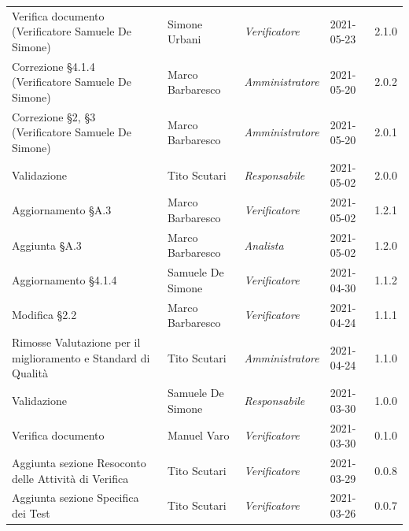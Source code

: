 \documentclass[a4paper]{article}
\begin{document}
\begin{center}
\begin{table}[h!]
\begin{tabular}{p{150px} p{90px} p{70px} p{60px} p{45px}}
            Verifica documento \newline (Verificatore Samuele De Simone)         & Simone Urbani     & \textit{Verificatore}   & 2021-05-23    & 2.1.0             \\
            Correzione \S 4.1.4 \newline (Verificatore Samuele De Simone)        & Marco Barbaresco  & \textit{Amministratore} & 2021-05-20    & 2.0.2             \\
            Correzione \S2, \S3 \newline (Verificatore Samuele De Simone)        & Marco Barbaresco  & \textit{Amministratore} & 2021-05-20    & 2.0.1             \\
            Validazione                                                          & Tito Scutari      & \textit{Responsabile}   & 2021-05-02    & 2.0.0             \\
            Aggiornamento \S A.3                                                 & Marco Barbaresco  & \textit{Verificatore}   & 2021-05-02    & 1.2.1             \\
            Aggiunta \S A.3                                                      & Marco Barbaresco  & \textit{Analista}       & 2021-05-02    & 1.2.0             \\
            Aggiornamento \S 4.1.4                                               & Samuele De Simone & \textit{Verificatore}   & 2021-04-30    & 1.1.2             \\
            Modifica \S 2.2                                                      & Marco Barbaresco  & \textit{Verificatore}   & 2021-04-24    & 1.1.1             \\
            Rimosse Valutazione per il miglioramento e Standard di Qualità       & Tito Scutari      & \textit{Amministratore} & 2021-04-24    & 1.1.0             \\
            Validazione                                                          & Samuele De Simone & \textit{Responsabile}   & 2021-03-30    & 1.0.0             \\
            Verifica documento                                                   & Manuel Varo       & \textit{Verificatore}   & 2021-03-30    & 0.1.0             \\
            Aggiunta sezione Resoconto delle Attività di Verifica                & Tito Scutari      & \textit{Verificatore}   & 2021-03-29    & 0.0.8             \\
            Aggiunta sezione Specifica dei Test                                  & Tito Scutari      & \textit{Verificatore}   & 2021-03-26    & 0.0.7             \\

\end{tabular}
\end{table}
\end{center}
\end{document}
